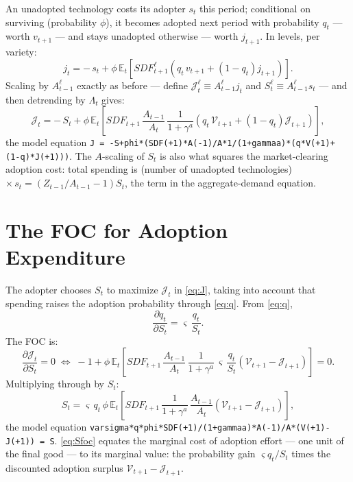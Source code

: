 \documentclass[11pt]{article}
\begin{document}
An unadopted technology costs its adopter $s_t$ this period; conditional on
surviving (probability $\phi$), it becomes adopted next period with probability
$q_t$ --- worth $v_{t+1}$ --- and stays unadopted otherwise --- worth $j_{t+1}$.
In levels, per variety:
\begin{equation}\label{eq:jsmall}
    j_t = -\,s_t + \phi\,\mathbb{E}_t\!\left[\mathit{SDF}^{\ell}_{t+1}
    \left(q_t\,v_{t+1} + \left(1-q_t\right) j_{t+1}\right)\right].
\end{equation}
Scaling by $A^{\ell}_{t-1}$ exactly as before --- define
$\mathcal{J}^{\ell}_t \equiv A^{\ell}_{t-1} j_t$ and
$S^{\ell}_t \equiv A^{\ell}_{t-1} s_t$ --- and then detrending by $\Lambda_t$
gives:
\begin{equation}\label{eq:J}
    \mathcal{J}_t = -\,S_t + \phi\,\mathbb{E}_t\!\left[\mathit{SDF}_{t+1}\,
    \frac{A_{t-1}}{A_{t}}\,\frac{1}{1+\gamma^{a}}
    \left(q_t\,\mathcal{V}_{t+1} + \left(1-q_t\right)\mathcal{J}_{t+1}\right)\right],
\end{equation}
the model equation \texttt{J = -S+phi*(SDF(+1)*A(-1)/A*1/(1+gammaa)*(q*V(+1)+
(1-q)*J(+1)))}. The $A$-scaling of $S_t$ is also what squares the market-clearing
adoption cost: total spending is (number of unadopted technologies) $\times\,s_t
= \left(Z_{t-1}/A_{t-1}-1\right) S_t$, the term in the aggregate-demand equation.

\section{The FOC for Adoption Expenditure}

The adopter chooses $S_t$ to maximize $\mathcal{J}_t$ in \eqref{eq:J}, taking into
account that spending raises the adoption probability through \eqref{eq:q}. From
\eqref{eq:q},
\begin{equation*}
    \frac{\partial q_t}{\partial S_t} = \varsigma\,\frac{q_t}{S_t}.
\end{equation*}
The FOC is:
\begin{equation*}
    \frac{\partial \mathcal{J}_t}{\partial S_t} = 0
    \;\Leftrightarrow\;
    -1 + \phi\,\mathbb{E}_t\!\left[\mathit{SDF}_{t+1}\,
    \frac{A_{t-1}}{A_{t}}\,\frac{1}{1+\gamma^{a}}\,
    \varsigma\,\frac{q_t}{S_t}
    \left(\mathcal{V}_{t+1} - \mathcal{J}_{t+1}\right)\right] = 0.
\end{equation*}
Multiplying through by $S_t$:
\begin{equation}\label{eq:Sfoc}
    S_t = \varsigma\, q_t\, \phi\,\mathbb{E}_t\!\left[\mathit{SDF}_{t+1}\,
    \frac{1}{1+\gamma^{a}}\,\frac{A_{t-1}}{A_{t}}
    \left(\mathcal{V}_{t+1} - \mathcal{J}_{t+1}\right)\right],
\end{equation}
the model equation \texttt{varsigma*q*phi*SDF(+1)/(1+gammaa)*A(-1)/A*(V(+1)-J(+1))
= S}. \eqref{eq:Sfoc} equates the marginal cost of adoption effort --- one unit of
the final good --- to its marginal value: the probability gain $\varsigma q_t/S_t$
times the discounted adoption surplus $\mathcal{V}_{t+1} - \mathcal{J}_{t+1}$.
\end{document}
